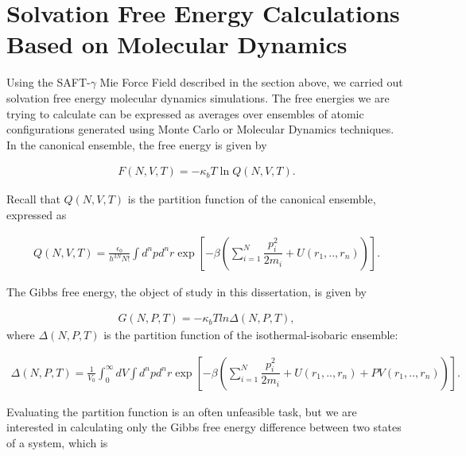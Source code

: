 \section{Solvation Free Energy Calculations Based on Molecular Dynamics}

Using the SAFT-$\gamma$ Mie Force Field described in the section above, we carried out solvation free energy molecular dynamics simulations. The free energies we are trying to calculate can be expressed as averages over ensembles of atomic configurations generated using Monte Carlo or Molecular Dynamics techniques. In the canonical ensemble, the free energy is given by  

\begin{equation}
\label{eq:fcano}
\begin{aligned}
F(N,V,T) = -\kappa_{b}T \ln Q(N,V,T).
\end{aligned}
\end{equation}

Recall that $Q(N,V,T)$ is the partition function of the canonical ensemble, expressed as

\begin{equation}
\label{eq:partican}
\begin{aligned}
Q(N,V,T) =\frac{\epsilon_{0}}{h^{3N}N!} \int d^{n}p d^{n}r \exp \left[ -\beta \left( \sum_{i=1}^{N}\dfrac{p_{i}^{2}}{2m_{i}} + U(r_{1},..,r_{n}) \right)
\right] .
\end{aligned}
\end{equation}

The Gibbs free energy, the object of study in this dissertation, is given by

\begin{equation}
\begin{aligned}
G(N,P,T) = -\kappa_{b}T ln \Delta (N,P,T),
\end{aligned}
\end{equation}
where $\Delta (N,P,T)$ is the partition function of the isothermal-isobaric ensemble:

\begin{equation}
\begin{aligned}
\Delta (N,P,T) = \frac{1}{V_{0}} \int_{0}^{\infty} dV \int d^{n}p d^{n}r \exp \left[ -\beta \left( \sum_{i=1}^{N}\dfrac{p_{i}^{2}}{2m_{i}} + U(r_{1},..,r_{n}) + PV(r_{1},..,r_{n}) \right) \right].
\end{aligned}
\end{equation}

Evaluating the partition function is an often unfeasible task, but we are interested in calculating only the Gibbs free energy difference between two states of a system, which is  

